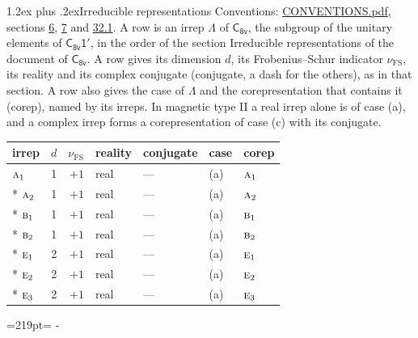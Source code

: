 \documentclass[10pt,a4paper]{article}
\makeatletter
\renewcommand\section{\@startsection{section}{1}{\z@}{-3ex plus -1ex minus -.2ex}%
  {1.2ex plus .2ex}{\normalfont\large\sffamily\bfseries\color{parttitle}}}
\newcommand{\needspace}[1]{\par\penalty-100\begingroup\dimen0=#1\relax\dimen2=\pagegoal
  \advance\dimen2-\pagetotal\ifdim\dimen0>\dimen2\relax\ifdim\dimen2>0pt\vfil\break\fi\fi
  \endgroup}
\numberwithin{equation}{section}
\newcommand{\grp}[1]{\mathsf{#1}}
\newcommand{\irr}[1]{\text{\normalfont\scshape #1}}
\newcommand{\fsind}{\nu_{\mathrm{FS}}}
\makeatother
\begin{document}
\section{Irreducible representations}\label{s:irreps}
Conventions: \href{../../CONVENTIONS.pdf}{CONVENTIONS.pdf}, sections \href{../../../rotation/CONVENTIONS.pdf\#conv.6}{6}, \href{../../../rotation/CONVENTIONS.pdf\#conv.7}{7} and \href{../../CONVENTIONS.pdf\#conv.32.1}{32.1}.
\leavevmode\label{n:irrep.Delta}A row is an irrep $\Lambda$ of $\grp{C_{8v}}$, the subgroup of the unitary elements of $\grp{C_{8v}1'}$, in the order of the section Irreducible representations of the document of \href{../../../rotation/data/pdf/C8v.pdf}{$\grp{C_{8v}}$}. \label{n:index.dimension}\label{n:index.frobenius}\label{n:head.irrep}\label{n:head.reality}\label{n:head.conjugate}A row gives its dimension $d$, its Frobenius--Schur indicator $\fsind$, its reality and its complex conjugate (conjugate, a dash for the others), as in that section. \label{n:head.case.corep}\label{n:head.corep}A row also gives the case of $\Lambda$ and the corepresentation that contains it (corep), named by its irreps. In magnetic type II a real irrep alone is of case (a), and a complex irrep forms a corepresentation of case (c) with its conjugate.
\setlength{\emergencystretch}{2em}\par\setlength{\emergencystretch}{0pt}
{\small\renewcommand{\arraystretch}{1.25}\setlength{\tabcolsep}{4pt}\begin{longtable}{@{}lrrllll@{}}\toprule
irrep & $d$ & $\fsind$ & reality & conjugate & case & corep\\\midrule\endhead
\bottomrule\endfoot\endlastfoot
$\irr{a}_{1}$ & 1 & $+1$ & real & --- & (a) & $\irr{a}_{1}$\\*
$\irr{a}_{2}$ & 1 & $+1$ & real & --- & (a) & $\irr{a}_{2}$\\*
$\irr{b}_{1}$ & 1 & $+1$ & real & --- & (a) & $\irr{b}_{1}$\\*
$\irr{b}_{2}$ & 1 & $+1$ & real & --- & (a) & $\irr{b}_{2}$\\*
$\irr{e}_{1}$ & 2 & $+1$ & real & --- & (a) & $\irr{e}_{1}$\\*
$\irr{e}_{2}$ & 2 & $+1$ & real & --- & (a) & $\irr{e}_{2}$\\*
$\irr{e}_{3}$ & 2 & $+1$ & real & --- & (a) & $\irr{e}_{3}$\\
\bottomrule\end{longtable}}
\needspace{219pt}
\end{document}
